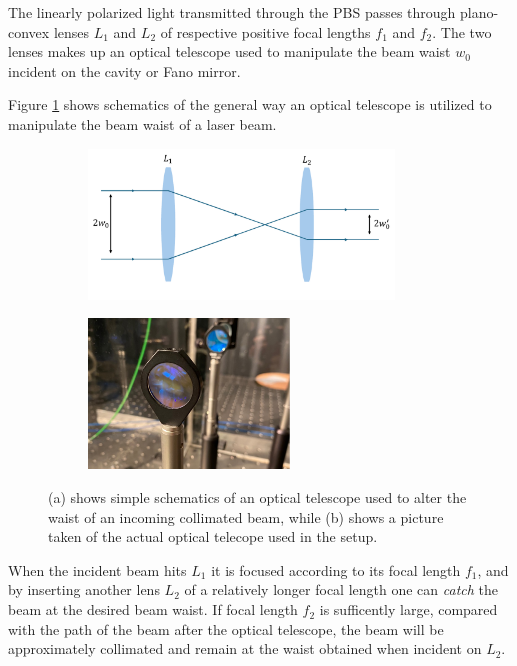 The linearly polarized light transmitted through the PBS passes through plano-convex lenses $L_1$ and $L_2$ of respective positive focal lengths $f_1$ and $f_2$. The two lenses makes up an optical telescope used to manipulate the beam waist $w_0$ incident on the cavity or Fano mirror. 

Figure \ref{fig:telescope} shows schematics of the general way an optical telescope is utilized to manipulate the beam waist of a laser beam.

\begin{figure}[h!]
    \begin{subfigure}[b]{0.49\textwidth}
        \centering
        \includegraphics[height=4cm]{figures/optical_telescope.pdf}
        \caption{}
        \label{fig:telescope}
    \end{subfigure}
    \begin{subfigure}[b]{0.49\textwidth}
        \centering
        \includegraphics[height=4cm]{figures/optical_telescope_picture.pdf}
        \caption{}
        \label{fig:telescope_picture}
    \end{subfigure}
    \caption{(a) shows simple schematics of an optical telescope used to alter the waist of an incoming collimated beam, while (b) shows a picture taken of the actual optical telecope used in the setup.}
    \label{fig:telescope_sketch_and_pic}
\end{figure}

When the incident beam hits $L_1$ it is focused according to its focal length $f_1$, and by inserting another lens $L_2$ of a relatively longer focal length one can \emph{catch} the beam at the desired beam waist. If focal length $f_2$ is sufficently large, compared with the path of the beam after the optical telescope, the beam will be approximately collimated and remain at the waist obtained when incident on $L_2$.

